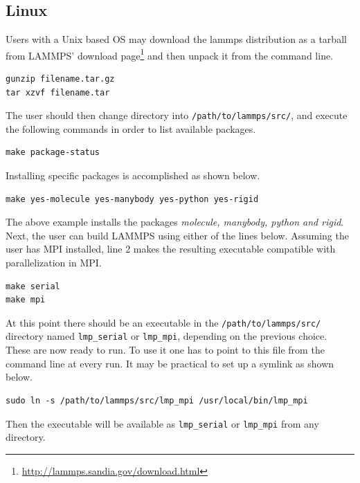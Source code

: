 \documentclass[twoside,english]{uiofysmaster}
\begin{document}
\subsection{Linux}
Users with a Unix based OS may download the lammps distribution as a tarball from LAMMPS' download page\footnote{\href{http://lammps.sandia.gov/download.html}{http://lammps.sandia.gov/download.html}} and then unpack it from the command line.
\begin{lstlisting}
gunzip filename.tar.gz
tar xzvf filename.tar
\end{lstlisting}
The user should then change directory into \texttt{/path/to/lammps/src/}, and execute the following commands in order to list available packages. 
\begin{lstlisting}
make package-status
\end{lstlisting}
Installing specific packages is accomplished as shown below.
\begin{lstlisting}
make yes-molecule yes-manybody yes-python yes-rigid 
\end{lstlisting}
The above example installs the packages \textit{molecule, manybody, python and rigid}.
Next, the user can build LAMMPS using either of the lines below. 
Assuming the user has MPI installed, line 2 makes the resulting executable compatible with parallelization in MPI.
\begin{lstlisting}
make serial
make mpi
\end{lstlisting}
At this point there should be an executable in the \texttt{/path/to/lammps/src/} directory named \texttt{lmp\_serial} or \texttt{lmp\_mpi}, depending on the previous choice. These are now ready to run.
To use it one has to point to this file from the command line at every run. It may be practical to set up a symlink as shown below.
\begin{lstlisting}
sudo ln -s /path/to/lammps/src/lmp_mpi /usr/local/bin/lmp_mpi
\end{lstlisting}
Then the executable will be available as \texttt{lmp\_serial} or \texttt{lmp\_mpi} from any directory. 
\end{document}
